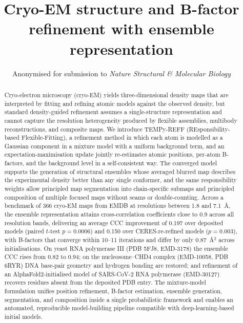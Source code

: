 \documentclass[11pt]{article}
\title{Cryo-EM structure and B-factor refinement with ensemble representation}
\author{Anonymised for submission to \emph{Nature Structural \& Molecular Biology}}
\date{}
\begin{document}
\maketitle

\begin{abstract}
Cryo-electron microscopy (cryo-EM) yields three-dimensional density maps that are interpreted by fitting and refining atomic models against the observed density, but standard density-guided refinement assumes a single-structure representation and cannot capture the resolution heterogeneity produced by flexible assemblies, multibody reconstructions, and composite maps. We introduce TEMPy-REFF (REsponsibility-based Flexible-Fitting), a
refinement method in which each atom is modelled as a Gaussian component in a
mixture model with a uniform background term, and an expectation-maximisation
update jointly re-estimates atomic positions, per-atom B-factors, and the
background level in a self-consistent way. The converged model supports the
generation of structural ensembles whose averaged blurred map describes the
experimental density better than any single conformer, and the same
responsibility weights allow principled map segmentation into chain-specific
submaps and principled composition of multiple focused maps without seams or
double-counting. Across a benchmark of 366 cryo-EM maps from EMDB at
resolutions between 1.8 and 7.1~\AA, the ensemble representation attains
cross-correlation coefficients close to 0.9 across all resolution bands,
delivering an average CCC improvement of 0.197 over deposited models
(paired $t$-test $p=0.0006$) and 0.150 over CERES-re-refined models
($p=0.003$), with B-factors that converge within 10--11 iterations and differ
by only 0.87~\AA$^{2}$ across initialisations. On yeast RNA polymerase III
(PDB 5FJ8, EMD-3178) the ensemble CCC rises from 0.82 to 0.94; on the
nucleosome--CHD4 complex (EMD-10058, PDB 6RYR) DNA base-pair geometry and
hydrogen bonding are restored; and refinement of an AlphaFold2-initialised
model of SARS-CoV-2 RNA polymerase (EMD-30127) recovers residues absent from
the deposited PDB entry. The mixture-model formulation unifies position
refinement, B-factor estimation, ensemble generation, segmentation, and
composition inside a single probabilistic framework and enables an automated,
reproducible model-building pipeline compatible with deep-learning-based
initial models.
\end{abstract}
\end{document}
